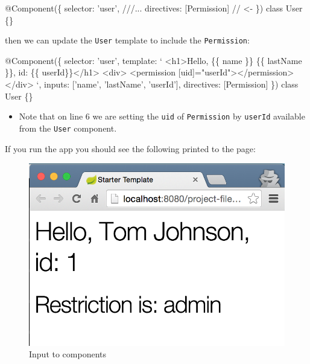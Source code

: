 \documentclass[12pt,]{article}
\newenvironment{Shaded}{}{}
\newcommand{\KeywordTok}[1]{\textcolor[rgb]{0.00,0.00,1.00}{{#1}}}
\newcommand{\StringTok}[1]{\textcolor[rgb]{0.00,0.50,0.50}{{#1}}}
\newcommand{\CommentTok}[1]{\textcolor[rgb]{0.00,0.50,0.00}{{#1}}}
\newcommand{\FunctionTok}[1]{{#1}}
\newcommand{\NormalTok}[1]{{#1}}
\providecommand{\tightlist}{%
  \setlength{\itemsep}{0pt}\setlength{\parskip}{0pt}}
\begin{document}
\begin{Shaded}
\begin{Highlighting}[numbers=left,,]
\FunctionTok{@Component}\NormalTok{(\{}
  \NormalTok{selector: 'user',}
  \CommentTok{///...}
  \NormalTok{directives: [Permission] }\CommentTok{// <-}
\NormalTok{\})}
\KeywordTok{class} \NormalTok{User \{\}}
\end{Highlighting}
\end{Shaded}

then we can update the \texttt{User} template to include the
\texttt{Permission}:

\begin{Shaded}
\begin{Highlighting}[numbers=left,,]
\FunctionTok{@Component}\NormalTok{(\{}
  \NormalTok{selector: 'user',}
  \NormalTok{template: `}
  \NormalTok{<h1>Hello, \{\{ name \}\} \{\{ lastName \}\}, id: \{\{ userId\}\}</h1>}
  \NormalTok{<div>}
    \NormalTok{<permission [uid]=}\StringTok{"userId"}\NormalTok{></permission>}
  \NormalTok{</div>}
  \NormalTok{`,}
  \NormalTok{inputs: ['name', 'lastName', 'userId'],}
  \NormalTok{directives: [Permission]}
\NormalTok{\})}
\KeywordTok{class} \NormalTok{User \{\}}
\end{Highlighting}
\end{Shaded}

\begin{itemize}
\tightlist
\item
  Note that on line 6 we are setting the \texttt{uid} of
  \texttt{Permission} by \texttt{userId} available from the
  \texttt{User} component.
\end{itemize}

If you run the app you should see the following printed to the page:

\begin{figure}[htbp]
\centering
\includegraphics{images/input-cmp.png}
\caption{Input to components}
\end{figure}
\end{document}
